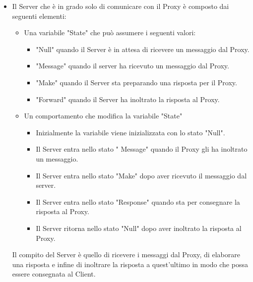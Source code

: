 \documentclass[13pt,a4paper]{article}
\begin{document}
\begin{itemize}
	\item Il Server che è in grado solo di comunicare con il Proxy è composto dai seguenti elementi:
	\begin{itemize}
		\item Una variabile "State" che può assumere i seguenti valori:
		\begin{itemize}
			\item "Null" quando il Server è in attesa di ricevere un messaggio dal Proxy.
			\item "Message" quando il server ha ricevuto un messaggio dal Proxy.
			\item "Make" quando il Server sta preparando una risposta per il Proxy.
			\item "Forward" quando il Server ha inoltrato la risposta al Proxy.
		\end{itemize}
		\item Un comportamento che modifica la variabile "State"
		\begin{itemize}
			\item Inizialmente la variabile viene inizializzata con lo stato "Null".
			\item Il Server entra nello stato " Message" quando il Proxy gli ha inoltrato un messaggio.
			\item Il Server entra nello stato "Make" dopo aver ricevuto il messaggio dal server.
			\item Il Server entra nello stato "Response" quando sta per consegnare la risposta al Proxy.
			\item Il Server ritorna nello stato "Null" dopo aver inoltrato la risposta al Proxy.
		\end{itemize}
	\end{itemize}
	Il compito del Server è quello di ricevere i messaggi dal Proxy, di elaborare una risposta e infine di inoltrare la risposta a quest'ultimo in modo che possa essere consegnata al Client.
\end{itemize}
\end{document}
